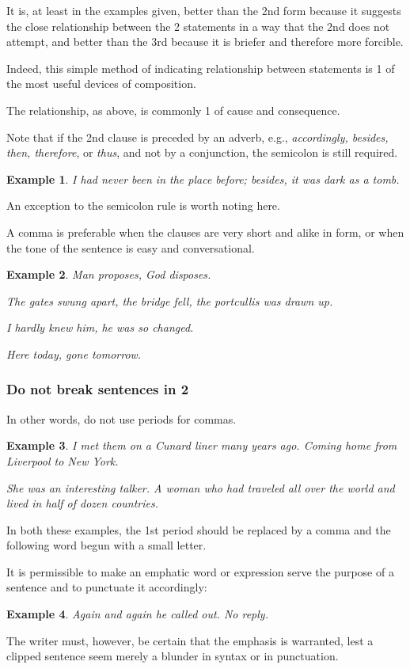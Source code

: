 \documentclass{article}
\newtheorem{example}{Example}
\begin{document}
It is, at least in the examples given, better than the 2nd form because it suggests the close relationship between the 2 statements in a way that the 2nd does not attempt, and better than the 3rd because it is briefer and therefore more forcible.

Indeed, this simple method of indicating relationship between statements is 1 of the most useful devices of composition.

The relationship, as above, is commonly 1 of cause and consequence.

%
Note that if the 2nd clause is preceded by an adverb, e.g., {\it accordingly, besides, then, therefore}, or {\it thus}, and not by a conjunction, the semicolon is still required.
\begin{example}
	I had never been in the place before; besides, it was dark as a tomb.
\end{example}
An exception to the semicolon rule is worth noting here.

A comma is preferable when the clauses are very short and alike in form, or when the tone of the sentence is easy and conversational.
\begin{example}
	Man proposes, God disposes.
	
	The gates swung apart, the bridge fell, the portcullis was drawn up.
	
	I hardly knew him, he was so changed.
	
	Here today, gone tomorrow.
\end{example}


\subsubsection{Do not break sentences in 2}
In other words, do not use periods for commas.
\begin{example}
	I met them on a Cunard liner many years ago. Coming home from Liverpool to New York.
	
	She was an interesting talker. A woman who had traveled all over the world and lived in half of dozen countries.
\end{example}
In both these examples, the 1st period should be replaced by a comma and the following word begun with a small letter.

%
It is permissible to make an emphatic word or expression serve the purpose of a sentence and to punctuate it accordingly:
\begin{example}
	Again and again he called out. No reply.
\end{example}
The writer must, however, be certain that the emphasis is warranted, lest a clipped sentence seem merely a blunder in syntax or in punctuation.
\end{document}
